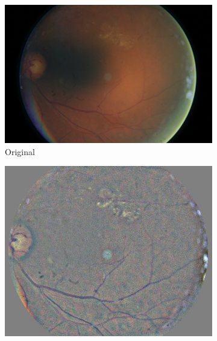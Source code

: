 \begin{figure}[tb]
    \bigskip
     \begin{subfigure}[b]{0.24\textwidth}
         \centering
         \includegraphics[width=\textwidth, height=\textwidth]{figures/chapter4/Preprocessing/Ori/54_right.jpeg}
         \caption{Original}
    \end{subfigure}
    \hfill
    \begin{subfigure}[b]{0.24\textwidth}
        \centering
        \includegraphics[width=\textwidth, height=\textwidth]{figures/chapter4/Preprocessing/Prep/54_right.jpeg}

\end{subfigure}
\end{figure}
